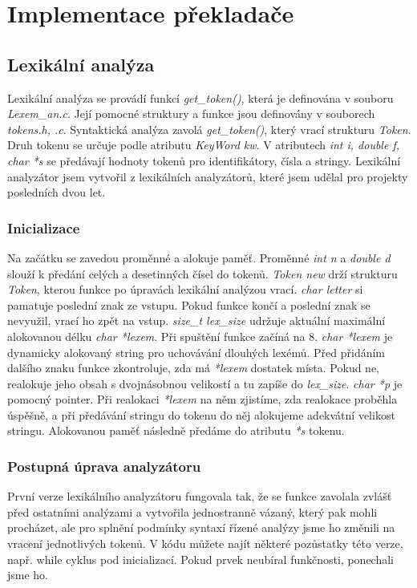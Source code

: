 \documentclass[a4paper, 12pt]{article}
\begin{document}
\newpage
{}
\section{Implementace překladače}
\subsection{Lexikální analýza}
Lexikální analýza se provádí funkcí \textit{get\_token()}, která je definována v souboru \textit{Lexem\_an.c}. Její pomocné struktury a funkce jsou definovány v souborech \textit{tokens.h, .c}.\newline
Syntaktická analýza zavolá \textit{get\_token()}, který vrací strukturu \textit{Token}. Druh tokenu se určuje podle atributu \textit{KeyWord kw}. V atributech \textit{int i, double f, char *s} se předávají hodnoty tokenů pro identifikátory, čísla a stringy.\newline
Lexikální analyzátor jsem vytvořil z lexikálních analyzátorů, které jsem udělal pro projekty posledních dvou let.

\subsubsection{Inicializace}
Na začátku se zavedou proměnné a alokuje paměť.\newline
Proměnné \textit{int n} a \textit{double d} slouží k předání celých a desetinných čísel do tokenů. \textit{Token new} drží strukturu \textit{Token}, kterou funkce po úpravách lexikální analýzou vrací. \textit{char letter} si pamatuje poslední znak ze vstupu. Pokud funkce končí a poslední znak se nevyužil, vrací ho zpět na vstup. \textit{size\_t lex\_size} udržuje aktuální maximální alokovanou délku \textit{char *lexem}. Při spuštění funkce začíná na 8. \textit{char *lexem} je dynamicky alokovaný string pro uchovávání dlouhých lexémů. Před přidáním dalšího znaku funkce zkontroluje, zda má \textit{*lexem} dostatek místa. Pokud ne, realokuje jeho obsah s dvojnásobnou velikostí a tu zapíše do \textit{lex\_size}. \textit{char *p} je pomocný pointer. Při realokaci \textit{*lexem} na něm zjistíme, zda realokace proběhla úspěšně, a při předávání stringu do tokenu do něj alokujeme adekvátní velikost stringu. Alokovanou paměť následně předáme do atributu \textit{*s} tokenu.

\subsubsection{Postupná úprava analyzátoru}
První verze lexikálního analyzátoru fungovala tak, že se funkce zavolala zvlášť před ostatními analýzami a vytvořila jednostranně vázaný, který pak mohli procházet, ale pro splnění podmínky syntaxí řízené analýzy jsme ho změnili na vracení jednotlivých tokenů. V kódu můžete najít některé pozůstatky této verze, např. while cyklus pod inicializací. Pokud prvek neubíral funkčnosti, ponechali jsme ho.
\end{document}
